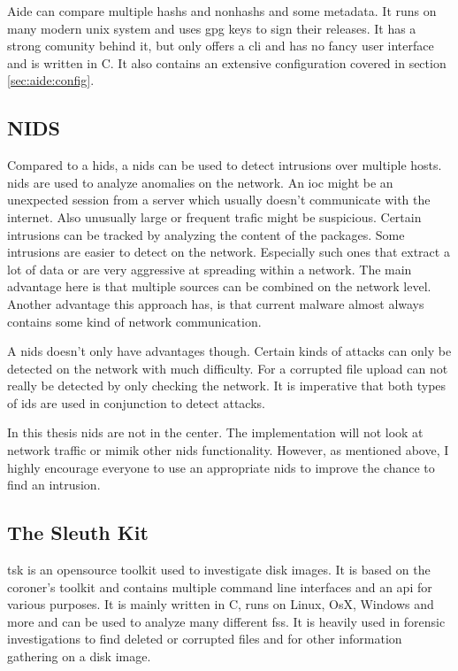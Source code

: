 \documentclass[
	a4paper,					%
	10pt,							%
	twoside,					%
	openright,				%
	notitlepage,			%
	parskip=half,			%
]{scrreprt}					%
\begin{document}
Aide can compare multiple \glspl{hash} and \glspl{nonhash} and some \gls{metadata}. It runs on many modern unix system \cite{aide} and uses gpg keys to sign their releases. It has a strong comunity behind it, but only offers a \gls{cli} and has no fancy user interface and is written in C. \cite{aide:github} It also contains an extensive configuration covered in section \ref{sec:aide:config}.


\subsection{NIDS}
\label{sec:def:nids}

Compared to a \gls{hids}, a \gls{nids} can be used to detect intrusions over multiple hosts. \gls{nids} are used to analyze anomalies on the network. An \gls{ioc}	might be an unexpected session from a server which usually doesn't communicate with the internet. Also unusually large or frequent trafic might be suspicious. Certain intrusions can be tracked by analyzing the content of the packages. Some intrusions are easier to detect on the network. Especially such ones that extract a lot of data or are very aggressive at spreading within a network. The main advantage here is that multiple sources can be combined on the network level. Another advantage this approach has, is that current \gls{malware} almost always contains some kind of network communication. \cite{Malware:Behaviour,nids}

A \gls{nids} doesn't only have advantages though. Certain kinds of attacks can only be detected on the network with much difficulty. For a corrupted file upload can not really be detected by only checking the network. It is imperative that both types of \gls{ids} are used in conjunction to detect attacks. 

In this thesis \gls{nids} are not in the center. The implementation will not look at network traffic or mimik other \gls{nids} functionality. However, as mentioned above, I highly encourage everyone to use an appropriate \gls{nids} to improve the chance to find an intrusion. 

\subsection{The Sleuth Kit}
\label{sec:tsk}

\gls{tsk} is an \gls{opensource} toolkit used to investigate disk images. It is based on the coroner's toolkit \cite{tct} and contains multiple command line interfaces and an \gls{api} for various purposes. \cite{tsk, tsk:about} It is mainly written in C, runs on Linux, OsX, Windows and more and can be used to analyze many different \glspl{fs}. It is heavily used in forensic investigations to find deleted or corrupted files and for other information gathering on a disk image.
\end{document}
